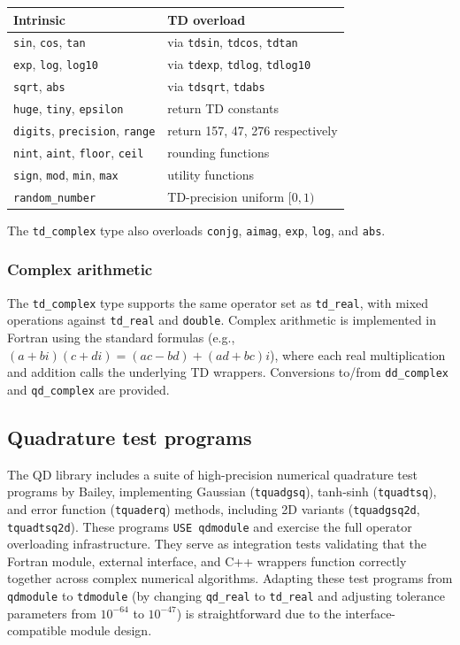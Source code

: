 \documentclass[11pt,a4paper]{article}
\begin{document}
\begin{center}
\begin{tabular}{ll}
\toprule
Intrinsic & TD overload \\
\midrule
\texttt{sin}, \texttt{cos}, \texttt{tan} & via \texttt{tdsin},
  \texttt{tdcos}, \texttt{tdtan} \\
\texttt{exp}, \texttt{log}, \texttt{log10} & via \texttt{tdexp},
  \texttt{tdlog}, \texttt{tdlog10} \\
\texttt{sqrt}, \texttt{abs} & via \texttt{tdsqrt},
  \texttt{tdabs} \\
\texttt{huge}, \texttt{tiny}, \texttt{epsilon} & return TD
  constants \\
\texttt{digits}, \texttt{precision}, \texttt{range} & return
  157, 47, 276 respectively \\
\texttt{nint}, \texttt{aint}, \texttt{floor}, \texttt{ceil}
  & rounding functions \\
\texttt{sign}, \texttt{mod}, \texttt{min}, \texttt{max}
  & utility functions \\
\texttt{random\_number} & TD-precision uniform $[0,1)$ \\
\bottomrule
\end{tabular}
\end{center}

The \texttt{td\_complex} type also overloads \texttt{conjg},
\texttt{aimag}, \texttt{exp}, \texttt{log}, and \texttt{abs}.

\subsubsection{Complex arithmetic}

The \texttt{td\_complex} type supports the same operator set as
\texttt{td\_real}, with mixed operations against \texttt{td\_real}
and \texttt{double}.  Complex arithmetic is implemented in
Fortran using the standard formulas (e.g., $(a+bi)(c+di) =
(ac-bd) + (ad+bc)i$), where each real multiplication and addition
calls the underlying TD wrappers.  Conversions to/from
\texttt{dd\_complex} and \texttt{qd\_complex} are provided.

\subsection{Quadrature test programs}

The QD library includes a suite of high-precision numerical
quadrature test programs by Bailey, implementing Gaussian
(\texttt{tquadgsq}), tanh-sinh (\texttt{tquadtsq}), and error
function (\texttt{tquaderq}) methods, including 2D variants
(\texttt{tquadgsq2d}, \texttt{tquadtsq2d}).  These programs
\texttt{USE qdmodule} and exercise the full operator overloading
infrastructure.  They serve as integration tests validating that
the Fortran module, external interface, and C++ wrappers function
correctly together across complex numerical algorithms.
Adapting these test programs from \texttt{qdmodule} to
\texttt{tdmodule} (by changing \texttt{qd\_real} to
\texttt{td\_real} and adjusting tolerance parameters from
$10^{-64}$ to $10^{-47}$) is straightforward due to the
interface-compatible module design.
\end{document}

